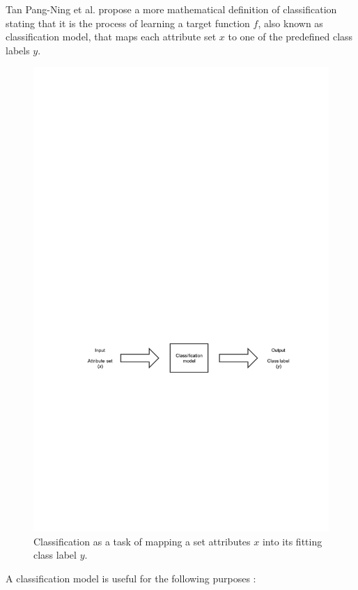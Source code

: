Tan Pang-Ning et al. propose a more mathematical definition of classification stating that it is the process of learning a target function $f$, also known as classification model, that maps each attribute set $x$ to one of the predefined class labels $y$.

\begin{figure}[!htp]
  \center
  \includegraphics[width=\textwidth]{figures/classification}
  \caption{Classification as a task of mapping a set attributes $x$ into its fitting class label $y$.}
  \label{fig:classification_task}
\end{figure}

A classification model is useful for the following purposes \cite{pang2006introduction}:

